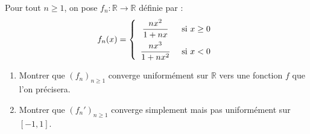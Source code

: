\documentclass[a4paper,twoside,french,11pt]{VcCours}
\begin{document}
\medskip

\begin{Exercice}{} Pour tout $n \geq 1$, on pose $f_n : \mathbb{R} \rightarrow \mathbb{R}$ définie par :
$$ f_n(x)= \left\lbrace \begin{array}{cl}
\dfrac{nx^2}{1+nx} & \hbox{ si } x \geq 0 \\[0.3cm]
\dfrac{nx^3}{1+nx^2} & \hbox{ si } x < 0 \\
\end{array}\right.$$
\begin{enumerate}
\item Montrer que $(f_n)_{n \geq 1}$ converge uniformément sur $\mathbb{R}$ vers une fonction $f$ que l'on précisera.
\item Montrer que $(f_n')_{n \geq 1}$ converge simplement mais pas uniformément sur $[-1,1]$.
\end{enumerate}
\end{Exercice}
\end{document}
